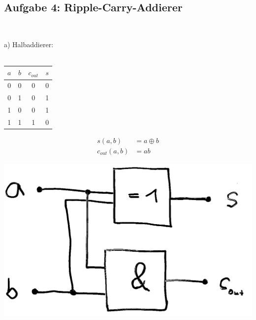 \documentclass{article}
\begin{document}
	\subsection*{Aufgabe 4: Ripple-Carry-Addierer}
	\hfill \\
	\begin{minipage}[t]{0.02\linewidth}
		\hfill
	\end{minipage}
	\begin{minipage}[t]{0.2\linewidth}
		a) Halbaddierer: \\\\
		\begin{tabular}{cc|cc}
			$a$ & $b$ & $c_{out}$ & $s$ \\ \hline
			0 & 0 & 0 & 0 \\
			0 & 1 & 0 & 1 \\
			1 & 0 & 0 & 1 \\
			1 & 1 & 1 & 0 
		\end{tabular}
		\begin{align*}
			s(a,b) &= a \oplus b \\
			c_{out}(a,b) &= ab
		\end{align*}
	\end{minipage} 
	\begin{minipage}[t]{0.2\linewidth}
		\vspace*{1em}
		\includegraphics[width=\linewidth]{halfadder.jpeg}
	\end{minipage}
	\begin{minipage}[t]{0.1\linewidth}
		\hfill
	\end{minipage}
\end{document}
